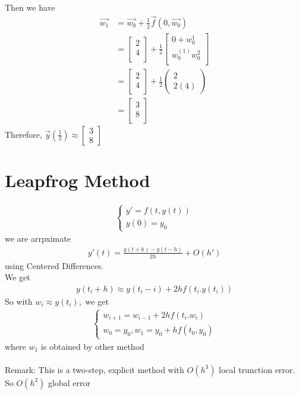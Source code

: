 \documentclass[11pt,oneside]{book}
\theoremstyle{break}
\theoremstyle{break}
\newcommand{\remark}{\color{blue}Remark: \color{black}}
\begin{document}
 Then we have \begin{align*}
 \vec{w_1}&=\vec{w_0}+\frac{1}{2}\vec{f}(0,\vec{w_0})\\
 &=\begin{bmatrix}
 2\\
 4\\
 \end{bmatrix}+\frac{1}{2}\begin{bmatrix}
 0+w_0^{1}\\
 w_0^{(1)}w_0^{2}\\
  \end{bmatrix}\\
 &=\begin{bmatrix}
 2\\
 4\\
 \end{bmatrix}+\frac{1}{2}\begin{pmatrix}
 2\\
 2(4)
 \end{pmatrix}\\
 &=\begin{bmatrix}
 3\\
 8\\
 \end{bmatrix}
 \end{align*}
 Therefore, $\vec{y}\left(\frac{1}{2} \right)
 \approx \begin{bmatrix}
 3\\
 8
 \end{bmatrix}$
 \section[Leapfrog Method]{Leapfrog Method}
 \begin{align*}
 \begin{cases}
 y'=f(t,y(t))\\
 y(0)=y_0
 \end{cases}
 \end{align*}
 we are arrpximate \begin{align*}
 y'(t)=\frac{y(t+h)-y(t-h)}{2h}+O(h')
 \end{align*}
 using Centered Differences.\\
 We get \begin{align*}
 y(t_i+h)\approx y(t_i-i)+2hf(t_i.y(t_i))
 \end{align*}
 So with $w_i\approx y(t_i),$ we get \begin{align*}
 \begin{cases}
 w_{i+1}=w_{i-1}+2hf(t_i.w_i)\\
 w_0=y_0,w_1=y_0+hf(t_0,y_0)
 \end{cases}
 \end{align*}
 where $w_1$ is obtained by other method\\
 \hfill\\
 \remark This is a two-step, explicit method with $O(h^3)$ local trunction error. So $O(h^2)$ global error\\
 \hfill\\
\end{document}
